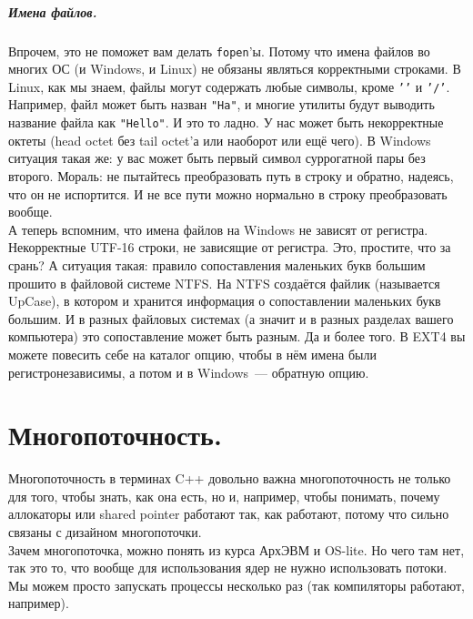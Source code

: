\documentclass{article}
\begin{document}
    \subparagraph{Имена файлов.}
    Впрочем, это не поможет вам делать \texttt{fopen}'ы. Потому что имена файлов во многих ОС (и Windows, и Linux) не обязаны являться корректными строками. В Linux, как мы знаем, файлы могут содержать любые символы, кроме \texttt{'\0'} и \texttt{'/'}. Например, файл может быть назван \texttt{"Ha\bello"}, и многие утилиты будут выводить название файла как \texttt{"Hello"}. И это то ладно. У нас может быть некорректные октеты (head octet без tail octet'а или наоборот или ещё чего). В Windows ситуация такая же: у вас может быть первый символ суррогатной пары без второго. Мораль: не пытайтесь преобразовать путь в строку и обратно, надеясь, что он не испортится. И не все пути можно нормально в строку преобразовать вообще.\\
    А теперь вспомним, что имена файлов на Windows не зависят от регистра. Некорректные UTF-16 строки, не зависящие от регистра. Это, простите, что за срань? А ситуация такая: правило сопоставления маленьких букв большим прошито в файловой системе NTFS. На NTFS создаётся файлик (называется UpCase), в котором и хранится информация о сопоставлении маленьких букв большим. И в разных файловых системах (а значит и в разных разделах вашего компьютера) это сопоставление может быть разным. Да и более того. В EXT4 вы можете повесить себе на каталог опцию, чтобы в нём имена были регистронезависимы, а потом и в Windows~--- обратную опцию.
    \section{Многопоточность.}
    Многопоточность в терминах C++ довольно важна многопоточность не только для того, чтобы знать, как она есть, но и, например, чтобы понимать, почему аллокаторы или shared pointer работают так, как работают, потому что сильно связаны с дизайном многопоточки.\\
    Зачем многопоточка, можно понять из курса АрхЭВМ и OS-lite. Но чего там нет, так это то, что вообще для использования ядер не нужно использовать потоки. Мы можем просто запускать процессы несколько раз (так компиляторы работают, например).
\end{document}
